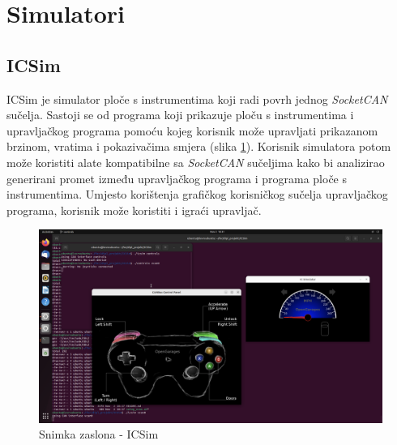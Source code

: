 \documentclass[times, utf8, diplomski, numeric]{fer}
\begin{document}
\section{Simulatori}
\subsection{ICSim}
ICSim je simulator ploče s instrumentima koji radi povrh jednog \textit{SocketCAN} sučelja. Sastoji se od programa koji prikazuje ploču s instrumentima i upravljačkog programa pomoću kojeg korisnik može upravljati prikazanom brzinom, vratima i pokazivačima smjera (slika \ref{fig:icsim}). Korisnik simulatora potom može koristiti alate kompatibilne sa \textit{SocketCAN} sučeljima kako bi analizirao generirani promet između upravljačkog programa i programa ploče s instrumentima. Umjesto korištenja grafičkog korisničkog sučelja upravljačkog programa, korisnik može koristiti i igraći upravljač. 

\begin{figure}[htb]
\centering
\includegraphics[width=370pt]{icsim.png}
\caption{Snimka zaslona - ICSim}
\label{fig:icsim}
\end{figure}
\end{document}
